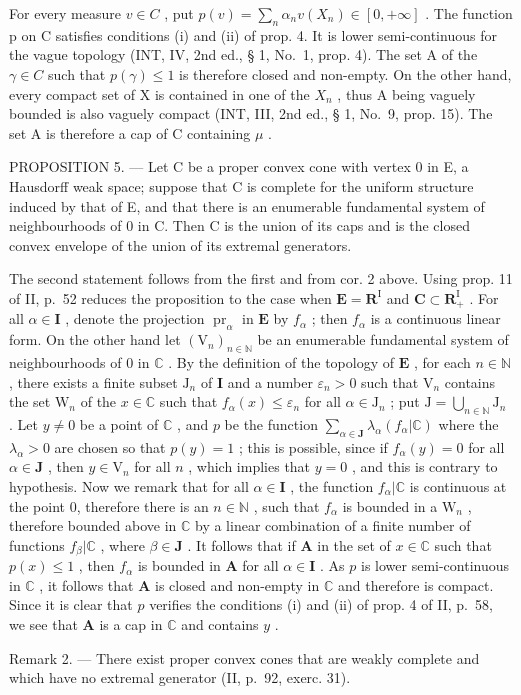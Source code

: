 For every measure \(v \in C\) , put \(p(v) = \sum_{n} \alpha_{n} v(X_{n}) \in [0, +\infty]\) . The function p on C satisfies conditions (i) and (ii) of prop. 4. It is lower semi-continuous for the vague topology (INT, IV, 2nd ed., § 1, No.~1, prop. 4). The set A of the \(\gamma \in C\) such that \(p(\gamma) \leqslant 1\) is therefore closed and non-empty. On the other hand, every compact set of X is contained in one of the \(X_{n}\) , thus A being vaguely bounded is also vaguely compact (INT, III, 2nd ed., § 1, No.~9, prop. 15). The set A is therefore a cap of C containing \(\mu\) .

PROPOSITION 5. --- Let C be a proper convex cone with vertex 0 in E, a Hausdorff weak space; suppose that C is complete for the uniform structure induced by that of E, and that there is an enumerable fundamental system of neighbourhoods of 0 in C. Then C is the union of its caps and is the closed convex envelope of the union of its extremal generators.

The second statement follows from the first and from cor. 2 above. Using prop. 11 of II, p.~52 reduces the proposition to the case when \(\mathbf{E} = \mathbf{R}^{\mathrm{I}}\) and \(\mathbf{C} \subset \mathbf{R}_{+}^{\mathrm{I}}\) . For all \(\alpha \in \mathbf{I}\) , denote the projection \(\operatorname{pr}_{\alpha}\) in \(\mathbf{E}\) by \(f_{\alpha}\) ; then \(f_{\alpha}\) is a continuous linear form. On the other hand let \((\mathrm{V}_n)_{n \in \mathbb{N}}\) be an enumerable fundamental system of neighbourhoods of 0 in \(\mathbb{C}\) . By the definition of the topology of \(\mathbf{E}\) , for each \(n \in \mathbb{N}\) , there exists a finite subset \(\mathrm{J}_n\) of \(\mathbf{I}\) and a number \(\varepsilon_n > 0\) such that \(\mathrm{V}_n\) contains the set \(\mathrm{W}_n\) of the \(x \in \mathbb{C}\) such that \(f_{\alpha}(x) \leqslant \varepsilon_n\) for all \(\alpha \in \mathrm{J}_n\) ; put \(\mathrm{J} = \bigcup_{n \in \mathbb{N}} \mathrm{J}_n\) . Let \(y \neq 0\) be a point of \(\mathbb{C}\) , and \(p\) be the function \(\sum_{\alpha \in \mathbf{J}} \lambda_{\alpha}(f_{\alpha}|\mathbb{C})\) where the \(\lambda_{\alpha} > 0\) are chosen so that \(p(y) = 1\) ; this is possible, since if \(f_{\alpha}(y) = 0\) for all \(\alpha \in \mathbf{J}\) , then \(y \in \mathrm{V}_n\) for all \(n\) , which implies that \(y = 0\) , and this is contrary to hypothesis. Now we remark that for all \(\alpha \in \mathbf{I}\) , the function \(f_{\alpha}|\mathbb{C}\) is continuous at the point 0, therefore there is an \(n \in \mathbb{N}\) , such that \(f_{\alpha}\) is bounded in a \(\mathrm{W}_n\) , therefore bounded above in \(\mathbb{C}\) by a linear combination of a finite number of functions \(f_{\beta}|\mathbb{C}\) , where \(\beta \in \mathbf{J}\) . It follows that if \(\mathbf{A}\) in the set of \(x \in \mathbb{C}\) such that \(p(x) \leqslant 1\) , then \(f_{\alpha}\) is bounded in \(\mathbf{A}\) for all \(\alpha \in \mathbf{I}\) . As \(p\) is lower semi-continuous in \(\mathbb{C}\) , it follows that \(\mathbf{A}\) is closed and non-empty in \(\mathbb{C}\) and therefore is compact. Since it is clear that \(p\) verifies the conditions (i) and (ii) of prop. 4 of II, p.~58, we see that \(\mathbf{A}\) is a cap in \(\mathbb{C}\) and contains \(y\) .

Remark 2. --- There exist proper convex cones that are weakly complete and which have no extremal generator (II, p.~92, exerc. 31).

